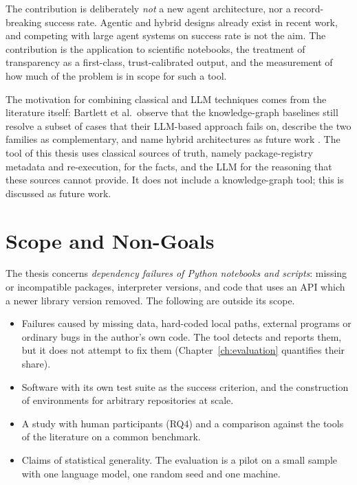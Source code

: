 The contribution is deliberately \emph{not} a new agent architecture, nor a record-breaking success rate. Agentic and hybrid designs already exist in recent work, and competing with large agent systems on success rate is not the aim. The contribution is the application to scientific notebooks, the treatment of transparency as a first-class, trust-calibrated output, and the measurement of how much of the problem is in scope for such a tool.%

The motivation for combining classical and \ac{LLM} techniques comes from the literature itself: Bartlett et al.\ observe that the knowledge-graph baselines still resolve a subset of cases that their \ac{LLM}-based approach fails on, describe the two families as complementary, and name hybrid architectures as future work \cite{bartlett2025lastdependency}. The tool of this thesis uses classical sources of truth, namely package-registry metadata and re-execution, for the facts, and the \ac{LLM} for the reasoning that these sources cannot provide. It does not include a knowledge-graph tool; this is discussed as future work.

\section{Scope and Non-Goals}\label{sec:scope}

The thesis concerns \emph{dependency failures of Python notebooks and scripts}: missing or incompatible packages, interpreter versions, and code that uses an \ac{API} which a newer library version removed. The following are outside its scope.

\begin{itemize}
  \item Failures caused by missing data, hard-coded local paths, external programs or ordinary bugs in the author's own code. The tool detects and reports them, but it does not attempt to fix them (Chapter~\ref{ch:evaluation} quantifies their share).
  \item Software with its own test suite as the success criterion, and the construction of environments for arbitrary repositories at scale.
  \item A study with human participants (RQ4) and a comparison against the tools of the literature on a common benchmark.
  \item Claims of statistical generality. The evaluation is a pilot on a small sample with one language model, one random seed and one machine.
\end{itemize}

